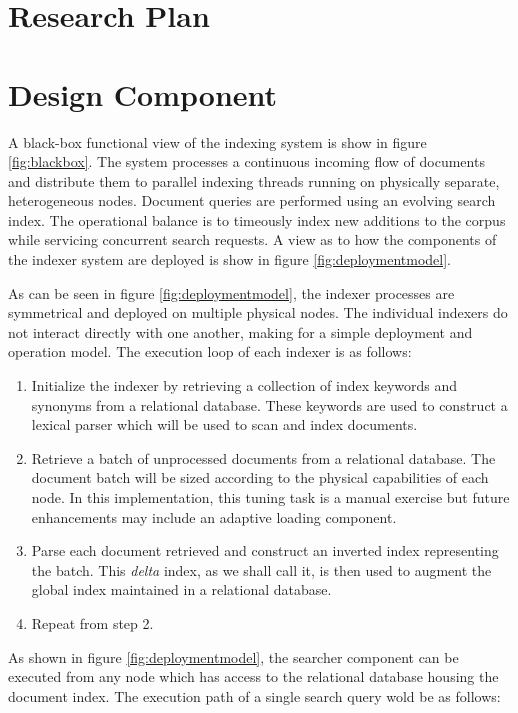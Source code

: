 \documentclass[10pt]{report}
\begin{document}
\section{Research Plan}
\label{sec:researchplan}


\section{Design Component}
\label{sec:designcomponent}
A black-box functional view of the indexing system is show in figure
\ref{fig:blackbox}. The system processes a continuous incoming flow of
documents and distribute them to parallel indexing threads running on
physically separate, heterogeneous nodes.  Document queries are performed
using an evolving search index. The operational balance is to
timeously index new additions to the corpus while servicing concurrent
search requests. A view as to how the components of the indexer system
are deployed is show in figure \ref{fig:deploymentmodel}.

As can be seen in figure \ref{fig:deploymentmodel}, the indexer
processes are symmetrical and deployed on multiple physical nodes. The
individual indexers do not interact directly with one another, making
for a simple deployment and operation model. The execution loop of
each indexer is as follows:

\begin{enumerate}
\item Initialize the indexer by retrieving a collection of index
  keywords and synonyms from a relational database. These keywords are
  used to construct a lexical parser which will be used to scan and
  index documents.
\item Retrieve a batch of unprocessed documents from a relational
  database. The document batch will be sized according to the physical
  capabilities of each node. In this implementation, this tuning task
  is a manual exercise but future enhancements may include an adaptive
  loading component.
\item Parse each document retrieved and construct an inverted index
  representing the batch. This \textit{delta} index, as we shall call
  it, is then used to augment the global index maintained in a
  relational database.
\item Repeat from step 2.
\end{enumerate}

As shown in figure \ref{fig:deploymentmodel}, the searcher component
can be executed from any node which has access to the relational
database housing the document index. The execution path of a single
search query wold be as follows:
\end{document}
